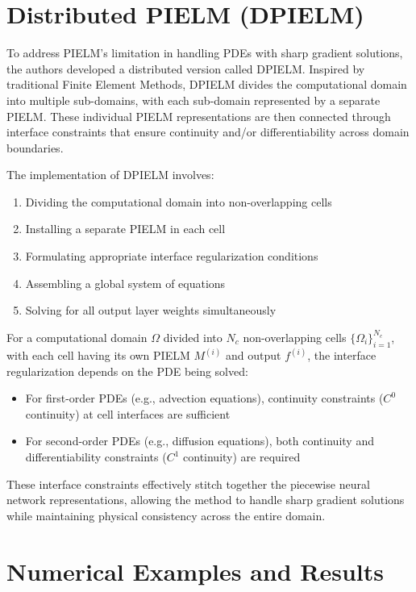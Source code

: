 \documentclass[11pt]{article}
\begin{document}
\section{Distributed PIELM (DPIELM)}

To address PIELM's limitation in handling PDEs with sharp gradient solutions, the authors developed a distributed version called DPIELM. Inspired by traditional Finite Element Methods, DPIELM divides the computational domain into multiple sub-domains, with each sub-domain represented by a separate PIELM. These individual PIELM representations are then connected through interface constraints that ensure continuity and/or differentiability across domain boundaries.

The implementation of DPIELM involves:
\begin{enumerate}
    \item Dividing the computational domain into non-overlapping cells
    \item Installing a separate PIELM in each cell
    \item Formulating appropriate interface regularization conditions
    \item Assembling a global system of equations
    \item Solving for all output layer weights simultaneously
\end{enumerate}

For a computational domain $\Omega$ divided into $N_c$ non-overlapping cells $\{\Omega_i\}_{i=1}^{N_c}$, with each cell having its own PIELM $M^{(i)}$ and output $f^{(i)}$, the interface regularization depends on the PDE being solved:
\begin{itemize}
    \item For first-order PDEs (e.g., advection equations), continuity constraints ($C^0$ continuity) at cell interfaces are sufficient
    \item For second-order PDEs (e.g., diffusion equations), both continuity and differentiability constraints ($C^1$ continuity) are required
\end{itemize}

These interface constraints effectively stitch together the piecewise neural network representations, allowing the method to handle sharp gradient solutions while maintaining physical consistency across the entire domain.

\section{Numerical Examples and Results}
\end{document}
